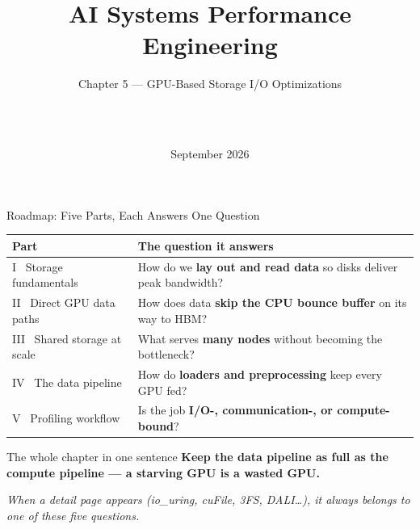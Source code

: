 \documentclass[aspectratio=169]{beamer}
\title[AI Systems Performance Engineering]{AI Systems Performance Engineering}
\subtitle{Chapter 5 --- GPU-Based Storage I/O Optimizations}
\author[\PresenterName\ \ \PresenterTitle\ \ \PresenterOrg]{\PresenterName\\\PresenterTitle\\\PresenterOrg}
\institute[]{\footnotesize Internal Training for Applied Scientists on AI Infrastructure}
\date{September 2026}
\newcommand{\kw}[1]{\textbf{\textcolor{kwblue}{#1}}}
\begin{document}
\begin{frame}
  \titlepage
\end{frame}

\begin{frame}{Roadmap: Five Parts, Each Answers One Question}
  \begingroup\small\setlength{\tabcolsep}{6pt}\renewcommand{\arraystretch}{1.25}
  \begin{tabular}{@{}ll@{}}
    \toprule
    \textbf{Part} & \textbf{The question it answers} \\
    \midrule
    I \ Storage fundamentals & How do we \kw{lay out and read data} so disks deliver peak bandwidth? \\
    II \ Direct GPU data paths & How does data \kw{skip the CPU bounce buffer} on its way to HBM? \\
    III \ Shared storage at scale & What serves \kw{many nodes} without becoming the bottleneck? \\
    IV \ The data pipeline & How do \kw{loaders and preprocessing} keep every GPU fed? \\
    V \ Profiling workflow & Is the job \kw{I/O-, communication-, or compute-bound}? \\
    \bottomrule
  \end{tabular}\endgroup
  \bigskip
  \begin{block}{The whole chapter in one sentence}
    \centering \kw{Keep the data pipeline as full as the compute pipeline --- a starving GPU is a wasted GPU.}
  \end{block}
  \medskip
  \centering\footnotesize\itshape
  When a detail page appears (io\_uring, cuFile, 3FS, DALI\ldots), it always belongs to one of these five questions.
\end{frame}
\end{document}
